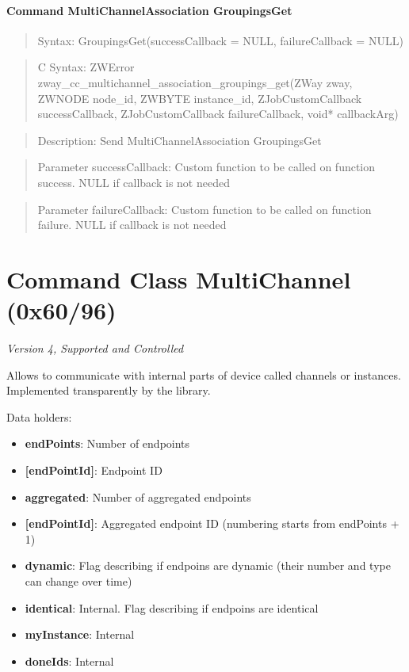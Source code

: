 \paragraph{Command MultiChannelAssociation GroupingsGet}
\begin{quote}Syntax: GroupingsGet(successCallback = NULL, failureCallback = NULL)\end{quote}
\begin{quote}C Syntax: ZWError zway\_cc\_multichannel\_association\_groupings\_get(ZWay zway, ZWNODE node\_id, ZWBYTE instance\_id, ZJobCustomCallback successCallback, ZJobCustomCallback failureCallback, void* callbackArg)\end{quote}
\begin{quote}Description: Send MultiChannelAssociation GroupingsGet\end{quote}
\begin{quote}Parameter successCallback: Custom function to be called on function success. NULL if callback is not needed\end{quote}
\begin{quote}Parameter failureCallback: Custom function to be called on function failure. NULL if callback is not needed\end{quote}



\section{Command Class MultiChannel (0x60/96)}

\textit{Version 4, Supported and Controlled}
\newline

Allows to communicate with internal parts of device called channels or instances. Implemented transparently by the library.
\newline

\noindent
Data holders:

\begin{itemize}
\item \textbf{endPoints}: Number of endpoints
\item \qquad\textbf{[endPointId]}: Endpoint ID
\item \textbf{aggregated}: Number of aggregated endpoints
\item \qquad\textbf{[endPointId]}: Aggregated endpoint ID (numbering starts from endPoints + 1)
\item \textbf{dynamic}: Flag describing if endpoins are dynamic (their number and type can change over time)
\item \textbf{identical}: Internal. Flag describing if endpoins are  identical
\item \textbf{myInstance}: Internal
\item \textbf{doneIds}: Internal
\end{itemize}

